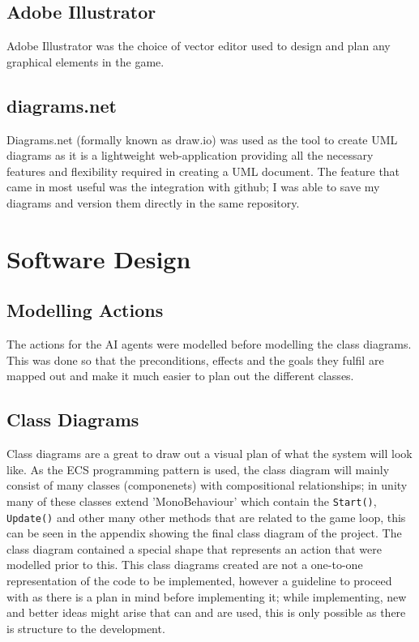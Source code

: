 \documentclass[11pt]{report}
\begin{document}
\subsection{Adobe Illustrator}
Adobe Illustrator was the choice of vector editor used to design and plan any graphical elements in the game. 

\subsection{diagrams.net}
Diagrams.net (formally known as draw.io) was used as the tool to create UML diagrams as it is a lightweight web-application providing all the necessary features and flexibility required in creating a UML document. The feature that came in most useful was the integration with github; I was able to save my diagrams and version them directly in the same repository.



\section{Software Design}

\subsection{Modelling Actions}
The actions for the AI agents were modelled before modelling the class diagrams. This was done so that the preconditions, effects and the goals they fulfil are mapped out and make it much easier to plan out the different classes.

\subsection{Class Diagrams}
Class diagrams are a great to draw out a visual plan of what the system will look like. As the ECS programming pattern is used, the class diagram will mainly consist of many classes (componenets) with compositional relationships; in unity many of these classes extend 'MonoBehaviour' which contain the \lstinline{Start()}, \lstinline{Update()} and other many other methods that are related to the game loop, this can be seen in the appendix showing the final class diagram of the project. The class diagram contained a special shape that represents an action that were modelled prior to this. 
This class diagrams created are not a one-to-one representation of the code to be implemented, however a guideline to proceed with as there is a plan in mind before implementing it; while implementing, new and better ideas might arise that can and are used, this is only possible as there is structure to the development.
\end{document}
